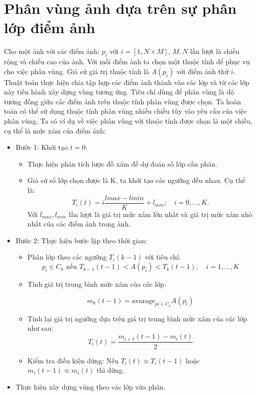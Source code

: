 \documentclass[12pt, oneside, a4paper]{book}
\begin{document}
\section{Phân vùng ảnh dựa trên sự phân lớp điểm ảnh}
Cho một ảnh với các điểm ảnh: $p_{i}$ với $i=[1,N\times M]$, $M,N$ lần lượt là chiều rộng và chiều cao của ảnh. Với mỗi điểm ảnh ta chọn một thuộc tính để phục vụ cho việc phân vùng. Giả sử giá trị thuộc tính là $A(p_{i})$ với điểm ảnh thứ $i$. Thuật toán thực hiện chia tập hợp các điểm ảnh thành vào các lớp và từ các lớp này tiến hành xây dựng vùng tương ứng. Tiêu chí dùng để phân vùng là độ tương đồng giữa các điểm ảnh trên thuộc tính phân vùng được chọn. Ta hoàn toản có thể sử dụng thuộc tính phân vùng nhiều chiều tùy vào yêu cầu của việc phân vùng.
Ta có ví dụ về việc phân vùng với thuộc tính được chọn là một chiều, cụ thể là mức xám của điểm ảnh:
\begin{itemize}
\item Bước 1:
Khởi tạo $t=0$:
\begin{itemize}
\item Thực hiện phân tích lược đồ xám để dự đoán số lớp cần phân.
\item Giả sử số lớp chọn được là K, ta khởi tạo các ngưỡng đều nhau. Cụ thể là:
\begin{equation*}
T_i(t)=i\dfrac{lmax-lmin}{K}+l_{min};\quad i=0, ..., K. 
\end{equation*}
Với $l_{max}, l_{min}$ lần lượt là giá trị mức xám lớn nhất và giá trị mức xám nhỏ nhất của các điểm ảnh trong ảnh.
\end{itemize}
\item Bước 2: Thực hiện bước lặp theo thời gian:
\begin{itemize}
\item Phân lớp theo các ngưỡng $T_i(k-1)$ với tiêu chí:
\begin{equation*}
p_i\in C_k \textrm{ nếu }T_{k-1}(t-1)<A(p_i)<T_{k}(t-1),\quad i=1, ..., K
\end{equation*}
\item Tính giá trị trung bình mức xám của các lớp:

\begin{equation*}
m_k(t-1)= \text{avarage}_{pi\in C_k}A(p_i)
\end{equation*}
\item Tính lại giá trị ngưỡng dựa trên giá trị trung bình mức xám của các lớp như sau:
\begin{equation*}
T_i(t)=\dfrac{m_{i+1}(t-1)-m_{i}(t)}{2}
\end{equation*}
\item Kiểm tra điều kiện dừng: 
Nếu $T_i(t)\approx T_i(t-1)$ hoặc $m_{i}(t-1)\approx m_{i}(t)$ thì dừng.
\end{itemize}
\item Thực hiện xây dựng vùng theo các lớp vừa phân.
\end{itemize}
\end{document}

